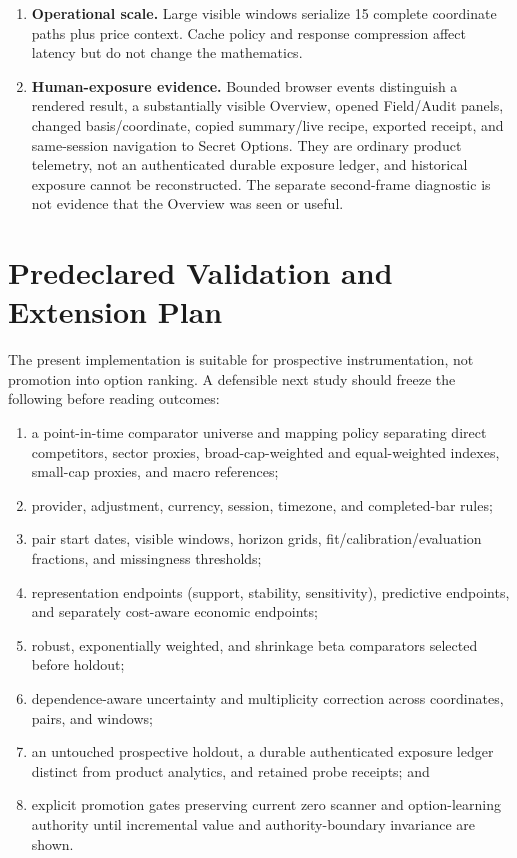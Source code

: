 \documentclass{article}
\begin{document}
\begin{enumerate}
    \item \textbf{Operational scale.} Large visible windows serialize 15 complete coordinate paths plus price context. Cache policy and response compression affect latency but do not change the mathematics.
    \item \textbf{Human-exposure evidence.} Bounded browser events distinguish a
    rendered result, a substantially visible Overview, opened Field/Audit
    panels, changed basis/coordinate, copied summary/live recipe, exported
    receipt, and same-session navigation to Secret Options. They are ordinary
    product telemetry, not an authenticated durable exposure ledger, and
    historical exposure cannot be reconstructed. The separate second-frame
    diagnostic is not evidence that the Overview was seen or useful.
\end{enumerate}

\section{Predeclared Validation and Extension Plan}

The present implementation is suitable for prospective instrumentation, not promotion into option ranking. A defensible next study should freeze the following before reading outcomes:
\begin{enumerate}
    \item a point-in-time comparator universe and mapping policy separating direct competitors, sector proxies, broad-cap-weighted and equal-weighted indexes, small-cap proxies, and macro references;
    \item provider, adjustment, currency, session, timezone, and completed-bar rules;
    \item pair start dates, visible windows, horizon grids, fit/calibration/evaluation fractions, and missingness thresholds;
    \item representation endpoints (support, stability, sensitivity), predictive endpoints, and separately cost-aware economic endpoints;
    \item robust, exponentially weighted, and shrinkage beta comparators selected before holdout;
    \item dependence-aware uncertainty and multiplicity correction across coordinates, pairs, and windows;
    \item an untouched prospective holdout, a durable authenticated exposure
    ledger distinct from product analytics, and retained probe receipts; and
    \item explicit promotion gates preserving current zero scanner and option-learning authority until incremental value and authority-boundary invariance are shown.
\end{enumerate}
\end{document}
